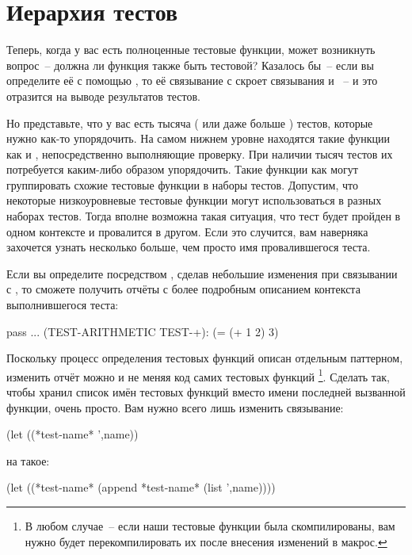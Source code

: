 \section{Иерархия тестов}

Теперь, когда у вас есть полноценные тестовые функции, может возникнуть вопрос~-- должна
ли функция  также быть тестовой? Казалось бы~-- если вы определите
её с помощью , то её связывание с  скроет связывания
 и ~-- и это отразится на выводе результатов тестов.

Но представьте, что у вас есть тысяча ( или даже больше ) тестов, которые нужно как-то
упорядочить. На самом нижнем уровне находятся такие функции как  и
, непосредственно выполняющие проверку. При наличии тысяч тестов их
потребуется каким-либо образом упорядочить. Такие функции как  могут
группировать схожие тестовые функции в наборы тестов. Допустим, что некоторые
низкоуровневые тестовые функции могут использоваться в разных наборах тестов. Тогда вполне
возможна такая ситуация, что тест будет пройден в одном контексте и провалится в
другом. Если это случится, вам наверняка захочется узнать несколько больше, чем просто имя
провалившегося теста.

Если вы определите  посредством , сделав небольшие
изменения при связывании с , то сможете получить отчёты с более
подробным описанием контекста выполнившегося теста:

\begin{myverb}
pass ... (TEST-ARITHMETIC TEST-+): (= (+ 1 2) 3)
\end{myverb}

Поскольку процесс определения тестовых функций описан отдельным паттерном, изменить отчёт
можно и не меняя код самих тестовых функций \footnote{В любом случае~-- если наши
  тестовые функции была скомпилированы, вам нужно будет перекомпилировать их после
  внесения изменений в макрос.}. Сделать так, чтобы  хранил список имён
тестовых функций вместо имени последней вызванной функции, очень просто. Вам нужно всего
лишь изменить связывание:

\begin{myverb}
(let ((*test-name* ',name))
\end{myverb}

на такое:

\begin{myverb}
(let ((*test-name* (append *test-name* (list ',name))))
\end{myverb}

